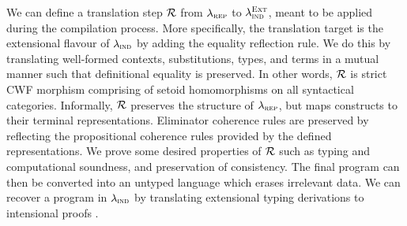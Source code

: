 We can define a translation step $\mathcal{R}$ from $\lambda_{\textsc{rep}}$ to
$\lambda_{\textsc{ind}}^{\textsc{Ext}}$, meant to be applied during the compilation process.
More specifically, the translation target is the extensional flavour of
$\lambda_{\textsc{ind}}$ by adding the equality reflection rule. We do this by translating
well-formed contexts, substitutions, types, and terms in a mutual manner such
that definitional equality is preserved. In other words, $\mathcal{R}$ is strict CWF
\cite{Castellan2019-sh} morphism comprising of setoid homomorphisms on all
syntactical categories. Informally, $\mathcal{R}$ preserves the structure of
$\lambda_{\textsc{rep}}$, but maps constructs to their terminal representations. Eliminator
coherence rules are preserved by reflecting the propositional coherence rules
provided by the defined representations. We prove some desired properties of
$\mathcal{R}$ \cite{Boulier2017-cm} such as typing and computational soundness, and
preservation of consistency. The final program can then be converted into an
untyped language which erases irrelevant data. We can recover a program
in $\lambda_{\textsc{ind}}$ by translating extensional typing derivations to intensional
proofs \cite{Winterhalter2019-zw}.
